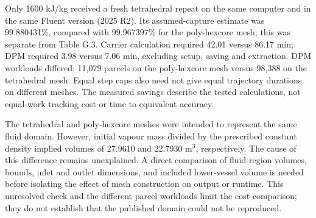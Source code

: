 Only 1600 kJ/kg received a fresh tetrahedral repeat on the same computer and in the same Fluent version (2025 R2). Its assumed-capture estimate was 99.880431\%, compared with 99.967397\% for the poly-hexcore mesh; this was separate from Table G.3. Carrier calculation required 42.01 versus 86.17 min; DPM required 3.98 versus 7.06 min, excluding setup, saving and extraction. DPM workloads differed: 11,079 parcels on the poly-hexcore mesh versus 98,388 on the tetrahedral mesh. Equal step caps also need not give equal trajectory durations on different meshes. The measured savings describe the tested calculations, not equal-work tracking cost or time to equivalent accuracy.

The tetrahedral and poly-hexcore meshes were intended to represent the same fluid domain. However, initial vapour mass divided by the prescribed constant density implied volumes of 27.9610 and 22.7930 m\(^3\), respectively. The cause of this difference remains unexplained. A direct comparison of fluid-region volumes, bounds, inlet and outlet dimensions, and included lower-vessel volume is needed before isolating the effect of mesh construction on output or runtime. This unresolved check and the different parcel workloads limit the cost comparison; they do not establish that the published domain could not be reproduced.

